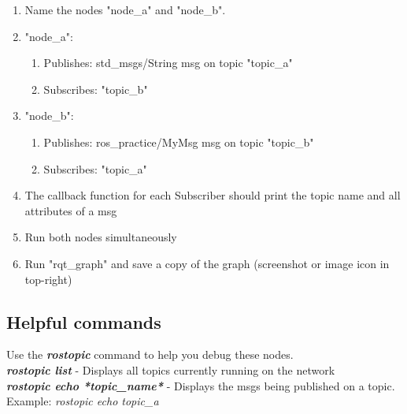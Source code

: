\documentclass[12pt]{article}
\newenvironment{task}[2][Task]{\begin{trivlist}
\item[\hskip \labelsep {\bfseries #1}\hskip \labelsep {\bfseries #2.}]}{\end{trivlist}}
\begin{document}
\begin{task}
{4. Create two nodes that publish and subscribe messages}
\end{task}

\begin{enumerate}
\item Name the nodes "node\_a" and "node\_b".

\item "node\_a":
\begin{enumerate}
\item Publishes: std\_msgs/String msg on topic "topic\_a"
\item Subscribes: "topic\_b"
\end{enumerate}

\item "node\_b":
\begin{enumerate}
\item Publishes: ros\_practice/MyMsg msg on topic "topic\_b"
\item Subscribes: "topic\_a"
\end{enumerate}

\item The callback function for each Subscriber should print the topic name and all attributes of a msg

\item Run both nodes simultaneously 

\item Run "rqt\_graph" and save a copy of the graph (screenshot or image icon in top-right)
\end{enumerate}
 
\subsection*{Helpful commands}
Use the \textbf{\emph{rostopic}} command to help you debug these nodes.\\
\textbf{\emph{rostopic list}} - Displays all topics currently running on the network\\
\textbf{\emph{rostopic echo *topic\_name*}} - Displays the msgs being published on a topic. Example: \emph{rostopic echo topic\_a}
 
\end{document}
